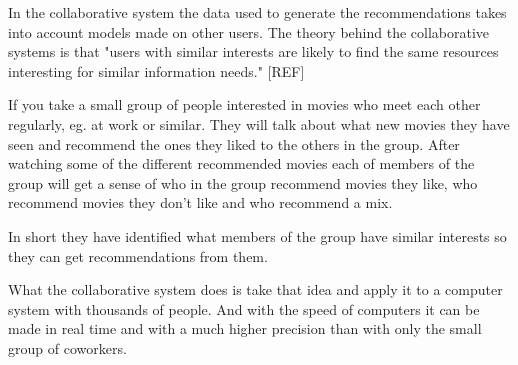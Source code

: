 In the collaborative system the data used to generate the recommendations takes into account models made on other users. The theory behind the collaborative systems is that "users with similar interests are likely to find the same resources interesting for similar information needs." [REF]

If you take a small group of people interested in movies who meet each other regularly, eg. at work or similar. They will talk about what new movies they have seen and recommend the ones they liked to the others in the group. After watching some of the different recommended movies each of members of the group will get a sense of who in the group recommend movies they like, who recommend movies they don't like and who recommend a mix.

In short they have identified what members of the group have similar interests so they can get recommendations from them.

What the collaborative system does is take that idea and apply it to a computer system with thousands of people. And with the speed of computers it can be made in real time and with a much higher precision than with only the small group of coworkers.